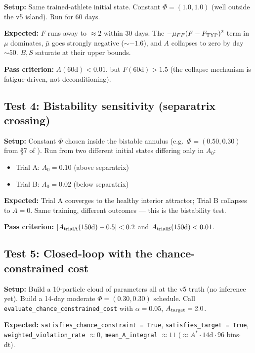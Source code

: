 \documentclass[11pt,a4paper]{article}
\theoremstyle{definition}
\begin{document}
\textbf{Setup:} Same trained-athlete initial state. Constant $\Phi =
(1.0, 1.0)$ (well outside the v5 island). Run for 60 days.

\textbf{Expected:} $F$ runs away to $\approx 2$ within 30 days. The
$-\mu_{FF}(F-F_{\rm TYP})^2$ term in $\mu$ dominates, $\bar\mu$ goes
strongly negative ($\sim -1.6$), and $A$ collapses to zero by day
$\sim 50$. $B, S$ saturate at their upper bounds.

\textbf{Pass criterion:} $A(60\text{d}) < 0.01$, but $F(60\text{d}) >
1.5$ (the collapse mechanism is fatigue-driven, not deconditioning).

\subsection{Test 4: Bistability sensitivity (separatrix crossing)}

\textbf{Setup:} Constant $\Phi$ chosen inside the bistable annulus
(e.g.\ $\Phi = (0.50, 0.30)$ from §7 of ). Run from two
different initial states differing only in $A_0$:
\begin{itemize}
  \item Trial A: $A_0 = 0.10$ (above separatrix)
  \item Trial B: $A_0 = 0.02$ (below separatrix)
\end{itemize}

\textbf{Expected:} Trial A converges to the healthy interior
attractor; Trial B collapses to $A = 0$. Same training, different
outcomes --- this is the bistability test.

\textbf{Pass criterion:} $|A_{\rm trial A}(150\text{d}) - 0.5| < 0.2$ and
$A_{\rm trial B}(150\text{d}) < 0.01$.

\subsection{Test 5: Closed-loop with the chance-constrained cost}

\textbf{Setup:} Build a 10-particle cloud of parameters all at the v5
truth (no inference yet). Build a 14-day moderate $\Phi = (0.30, 0.30)$
schedule. Call \texttt{evaluate\_chance\_constrained\_cost} with
$\alpha = 0.05$, $A_{\rm target} = 2.0$.

\textbf{Expected:} \texttt{satisfies\_chance\_constraint = True},
\texttt{satisfies\_target = True}, \texttt{weighted\_violation\_rate}
$\approx 0$, \texttt{mean\_A\_integral} $\approx 11$ ($\approx
A^* \cdot 14\text{d} \cdot 96$ bins$\cdot$ dt).
\end{document}

